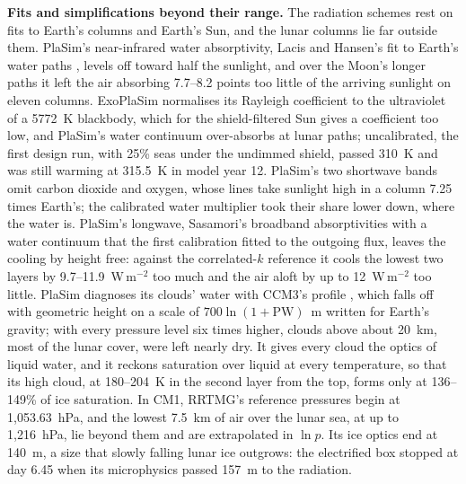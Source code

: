 \textbf{Fits and simplifications beyond their range.} The radiation schemes rest on fits to Earth's columns
and Earth's Sun, and the lunar columns lie far outside them. PlaSim's near-infrared water absorptivity,
Lacis and Hansen's fit to Earth's water paths \autocite{lacis1974parameterization}, levels off toward half
the sunlight, and over the Moon's longer paths it left the air absorbing 7.7--8.2 points too little of the
arriving sunlight on eleven columns. ExoPlaSim normalises its Rayleigh coefficient to the
ultraviolet of a 5772~K blackbody, which for the shield-filtered Sun gives a coefficient too low, and
PlaSim's water continuum over-absorbs at lunar paths; uncalibrated, the first design run, with 25\% seas
under the undimmed shield, passed 310~K and was still warming at 315.5~K in model year 12.
PlaSim's two shortwave bands omit carbon dioxide and oxygen, whose lines take sunlight high in a column 7.25
times Earth's; the calibrated water multiplier took their share lower down, where the water is.
PlaSim's longwave, Sasamori's broadband absorptivities \autocite{sasamori1968radiative} with a water
continuum that the first calibration fitted to the outgoing flux, leaves the cooling by height free: against
the correlated-$k$ reference it cools the lowest two layers by 9.7--11.9~W\,m$^{-2}$ too much and the air
aloft by up to 12~W\,m$^{-2}$ too little. PlaSim diagnoses its clouds' water with CCM3's profile
\autocite{kiehl1996description}, which falls off with geometric height on a scale of
$700\ln(1+\mathrm{PW})$~m written for Earth's gravity; with every pressure level six times higher, clouds
above about 20~km, most of the lunar cover, were left nearly dry. It gives every cloud the optics
of liquid water, and it reckons saturation over liquid at every temperature, so that its high cloud, at
180--204~K in the second layer from the top, forms only at 136--149\% of ice saturation. In CM1,
RRTMG's reference pressures begin at 1,053.63~hPa, and the lowest 7.5~km of air over the lunar sea, at up to
1,216~hPa, lie beyond them and are extrapolated in $\ln p$. Its ice optics end at 140~\textmu m, a size that
slowly falling lunar ice outgrows: the electrified box stopped at day 6.45 when its microphysics passed
157~\textmu m to the radiation.

